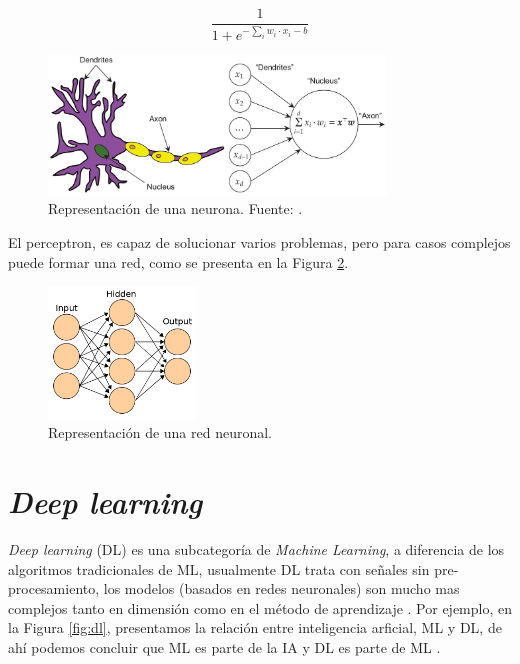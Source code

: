 \begin{equation}\label{eq:sigmoidea2}
	\frac{1}{1 + e^{-\sum_{i}^{} w_i \cdot x_i - b}}
\end{equation}


\begin{figure}[H]
	\centering
	\includegraphics[width=0.8\textwidth]{img/neoantigen/neuron}
	\caption{Representación de una neurona. Fuente: \cite{insideDL2022}.}
	\label{fig:neuron}
\end{figure}

El perceptron, es capaz de solucionar varios problemas, pero para casos complejos puede formar una red, como se presenta en la Figura \ref{fig:nn}.

\begin{figure}[H]
	\centering
	\includegraphics[width=0.35\textwidth]{img/neoantigen/nn2}
	\caption{Representación de una red neuronal. }
	\label{fig:nn}
\end{figure}

\section{\textit{Deep learning}}

\textit{Deep learning} (DL) es una subcategoría de \textit{Machine Learning}, a diferencia de los algoritmos tradicionales de ML, usualmente DL trata con señales sin pre-procesamiento, los modelos (basados en redes neuronales) son mucho mas complejos tanto en dimensión como en el método de aprendizaje \citep{el2022machine}. Por ejemplo, en la Figura \ref{fig:dl}, presentamos la relación entre inteligencia arficial, ML y DL, de ahí podemos concluir que ML es parte de la IA y DL es parte de ML \citep{el2022machine}.

